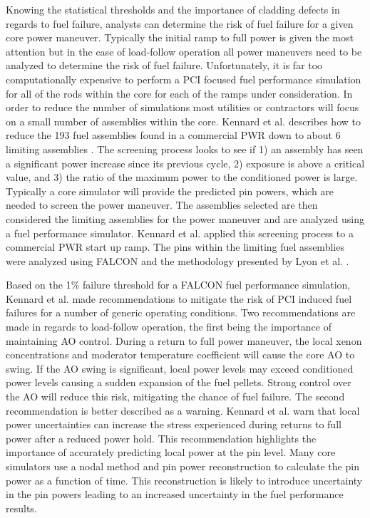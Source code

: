 \documentclass[edeposit,fullpage,11pt]{uiucthesis2009}
\begin{document}
Knowing the statistical thresholds and the importance of cladding defects in regards to fuel failure, analysts can determine the risk of fuel failure for a given core power maneuver.
Typically the initial ramp to full power is given the most attention but in the case of load-follow operation all power maneuvers need to be analyzed to determine the risk of fuel failure.
Unfortunately, it is far too computationally expensive to perform a \gls{PCI} focused fuel performance simulation for all of the rods within the core for each of the ramps under consideration.
In order to reduce the number of simulations most utilities or contractors will focus on a small number of assemblies within the core.
Kennard et al. describes how to reduce the 193 fuel assemblies found in a commercial \gls{PWR} down to about 6 limiting assemblies \cite{kennard_pci_2016}.
The screening process  looks to see if 1) an assembly has seen a significant power increase since its previous cycle, 2) exposure is above a critical value, and 3) the ratio of the maximum power to the conditioned power is large.
Typically a core simulator will provide the predicted pin powers, which are needed to screen the power maneuver.
The assemblies selected are then considered the limiting assemblies for the power maneuver and are analyzed using a fuel performance simulator.
Kennard et al. applied this screening process to a commercial \gls{PWR} start up ramp.
The pins within the limiting fuel assemblies were analyzed using FALCON and the methodology presented by Lyon et al. \cite{lyon_pci_2009}.

Based on the 1\% failure threshold for a FALCON fuel performance simulation, Kennard et al. made recommendations to mitigate the risk of \gls{PCI} induced fuel failures for a number of generic operating conditions.
Two recommendations are made in regards to load-follow operation, the first being the importance of maintaining \gls{AO} control.
During a return to full power maneuver, the local xenon concentrations and moderator temperature coefficient will cause the core \gls{AO} to swing.
If the \gls{AO} swing is significant, local power levels may exceed conditioned power levels causing a sudden expansion of the fuel pellets.
Strong control over the \gls{AO} will reduce this risk, mitigating the chance of fuel failure.
The second recommendation is better described as a warning.
Kennard et al. warn that local power uncertainties can increase the stress experienced during returns to full power after a reduced power hold.
This recommendation highlights the importance of accurately predicting local power at the pin  level.
Many core simulators use a nodal method and pin power reconstruction to calculate the pin power as a function of time.
This reconstruction is likely to introduce uncertainty in the pin powers leading to an increased uncertainty in the fuel performance results.
\end{document}

